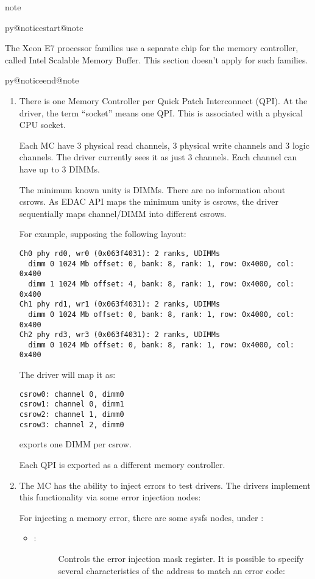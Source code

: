 \documentclass[a4paper,8pt,english]{sphinxmanual}
\makeatletter
\renewenvironment{notice}[2]{%
          \def\py@noticetype{#1}
          \begin{coloredbox}{#1}
          \bf\it
          \par\strong{#2}
          \csname py@noticestart@#1\endcsname
        }
	{
          \csname py@noticeend@\py@noticetype\endcsname
          \end{coloredbox}
        }
\makeatother
\begin{document}
\begin{notice}{note}{Note:}
The Xeon E7 processor families use a separate chip for the memory
controller, called Intel Scalable Memory Buffer. This section doesn't
apply for such families.
\end{notice}
\begin{enumerate}
\item {} 
There is one Memory Controller per Quick Patch Interconnect
(QPI). At the driver, the term ``socket'' means one QPI. This is
associated with a physical CPU socket.

Each MC have 3 physical read channels, 3 physical write channels and
3 logic channels. The driver currently sees it as just 3 channels.
Each channel can have up to 3 DIMMs.

The minimum known unity is DIMMs. There are no information about csrows.
As EDAC API maps the minimum unity is csrows, the driver sequentially
maps channel/DIMM into different csrows.

For example, supposing the following layout:

\begin{Verbatim}[commandchars=\\\{\}]
Ch0 phy rd0, wr0 (0x063f4031): 2 ranks, UDIMMs
  dimm 0 1024 Mb offset: 0, bank: 8, rank: 1, row: 0x4000, col: 0x400
  dimm 1 1024 Mb offset: 4, bank: 8, rank: 1, row: 0x4000, col: 0x400
Ch1 phy rd1, wr1 (0x063f4031): 2 ranks, UDIMMs
  dimm 0 1024 Mb offset: 0, bank: 8, rank: 1, row: 0x4000, col: 0x400
Ch2 phy rd3, wr3 (0x063f4031): 2 ranks, UDIMMs
  dimm 0 1024 Mb offset: 0, bank: 8, rank: 1, row: 0x4000, col: 0x400
\end{Verbatim}

The driver will map it as:

\begin{Verbatim}[commandchars=\\\{\}]
csrow0: channel 0, dimm0
csrow1: channel 0, dimm1
csrow2: channel 1, dimm0
csrow3: channel 2, dimm0
\end{Verbatim}

exports one DIMM per csrow.

Each QPI is exported as a different memory controller.

\item {} 
The MC has the ability to inject errors to test drivers. The drivers
implement this functionality via some error injection nodes:

For injecting a memory error, there are some sysfs nodes, under
:
\begin{itemize}
\item {} \begin{description}
\item[{:}] \leavevmode
Controls the error injection mask register. It is possible to specify
several characteristics of the address to match an error code:


\end{description}
\end{itemize}
\end{enumerate}
\end{document}
